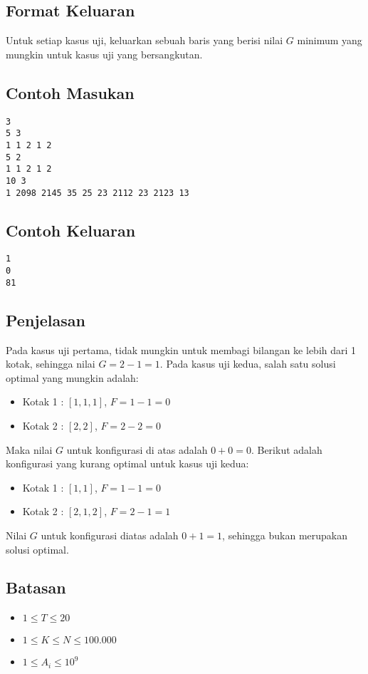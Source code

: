 \documentclass{article}
\begin{document}
\subsection*{Format Keluaran}

\par Untuk setiap kasus uji, keluarkan sebuah baris yang berisi nilai $G$ minimum yang mungkin untuk kasus uji yang bersangkutan.

\subsection*{Contoh Masukan}

\begin{lstlisting}
3
5 3
1 1 2 1 2
5 2
1 1 2 1 2
10 3
1 2098 2145 35 25 23 2112 23 2123 13
\end{lstlisting}

\subsection*{Contoh Keluaran}

\begin{lstlisting}
1
0
81
\end{lstlisting}

\subsection*{Penjelasan}

Pada kasus uji pertama, tidak mungkin untuk membagi bilangan ke lebih dari 1 kotak, sehingga nilai $G = 2 - 1 = 1$.
\newline 
\newline Pada kasus uji kedua, salah satu solusi optimal yang mungkin adalah:
\begin{itemize}
\item Kotak 1 : $[1, 1, 1]$, $F = 1 - 1 = 0$
\item Kotak 2 : $[2, 2]$, $F = 2 - 2 = 0$
\end{itemize}

\par\noindent Maka nilai $G$ untuk konfigurasi di atas adalah $0 + 0 = 0$.
\newline
\newline Berikut adalah konfigurasi yang kurang optimal untuk kasus uji kedua:
\begin{itemize}
\item Kotak 1 : $[1, 1]$, $F = 1 - 1 = 0$
\item Kotak 2 : $[2, 1, 2]$, $F = 2 - 1 = 1$
\end{itemize}

\par\noindent Nilai $G$ untuk konfigurasi diatas adalah $0 + 1 = 1$, sehingga bukan merupakan solusi optimal.

\subsection*{Batasan}

\begin{itemize}
	\item $1 \leq T \leq 20$
	\item $1 \leq K \leq N\leq 100.000$
	\item $1 \leq A_i\leq10^9$
\end{itemize}
\end{document}
